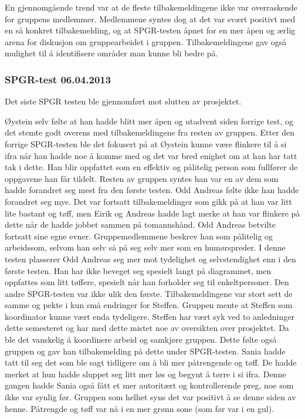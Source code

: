 \documentclass[a4paper,norsk,oneside]{article}
\begin{document}
En gjennomgående trend var at de fleste tilbakemeldingene ikke var overraskende for gruppens medlemmer. Medlemmene syntes dog at det var svært positivt med en så konkret tilbakemelding, og at SPGR-testen åpnet for en mer åpen og ærlig arena for diskusjon om gruppearbeidet i gruppen. Tilbakemeldingene gav også mulighet til å identifisere områder man kunne bli bedre på.


\subsubsection{SPGR-test 06.04.2013}
Det siste SPGR testen ble gjennomført mot slutten av prosjektet.

Øystein selv følte at han hadde blitt mer åpen og utadvent siden forrige test, og det stemte godt overens med tilbakemeldingene fra resten av gruppen. Etter den forrige SPGR-testen ble det fokusert på at Øystein kunne være flinkere til å si ifra når han hadde noe å komme med og det var bred enighet om at han har tatt tak i dette. Han blir oppfattet som en effektiv og pålitelig person som fullfører de oppgavene han får tildelt. Resten av gruppen syntes han var en av dem som hadde forandret seg mest fra den første testen.
Odd Andreas følte ikke han hadde forandret seg mye. Det var fortsatt tilbakemeldinger som gikk på at han var litt lite bastant og tøff, men Eirik og Andreas hadde lagt merke at han var flinkere på dette når de hadde jobbet sammen på tomannshånd. Odd Andreas betvilte fortsatt sine egne evner. Gruppemedlemmene beskrev han som pålitelig og arbeidssom, selvom han selv så på seg selv mer som en humørspreder. I denne testen plasserer Odd Andreas seg mer mot tydelighet og selvstendighet enn i den første testen. Han har ikke beveget seg spesielt langt på diagrammet, men oppfattes som litt tøffere, spesielt når han forholder seg til enkeltpersoner.
Den andre SPGR-testen var ikke ulik den første. Tilbakemeldingene var stort sett de samme og pekte i kun små endringer for Steffen. Gruppen mente at Steffen som koordinator kunne vært enda tydeligere. Steffen har vært syk ved to anledninger dette semesteret og har med dette mistet noe av oversikten over prosjektet. Da ble det vanskelig å koordinere arbeid og samkjøre gruppen. Dette følte også gruppen og gav han tilbakemelding på dette under SPGR-testen.
Sania hadde tatt til seg det som ble sagt tidligere om å bli mer påtrengende og tøff. De hadde merket at hun hadde sluppet seg litt mer løs og begynt å tørre i si ifra. Denne gangen hadde Sania også fått et mer autoritært og kontrollerende preg, noe som ikke var synlig før. Gruppen som helhet syns det var positivt å se denne siden av henne. Påtrengde og tøff var nå i en mer grønn sone (som før var i en gul).
\end{document}
